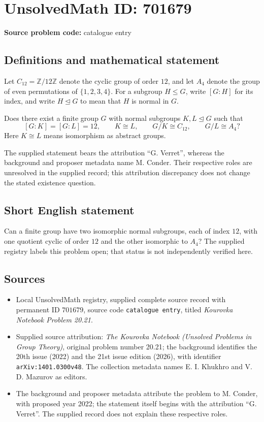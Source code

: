 \documentclass[11pt]{article}
\newcommand{\Z}{\mathbb{Z}}
\begin{document}
\section*{UnsolvedMath ID: 701679}
\textbf{Source problem code:} catalogue entry
\subsection{Definitions and mathematical statement}
Let \(C_{12}=\Z/12\Z\) denote the cyclic group of order \(12\), and let \(A_4\) denote the group of even permutations of \(\{1,2,3,4\}\). For a subgroup \(H\leq G\), write \([G:H]\) for its index, and write \(H\trianglelefteq G\) to mean that \(H\) is normal in \(G\).

Does there exist a finite group \(G\) with normal subgroups \(K,L\trianglelefteq G\) such that
\[
[G:K]=[G:L]=12,\qquad K\cong L,\qquad G/K\cong C_{12},\qquad G/L\cong A_4?
\]
Here \(K\cong L\) means isomorphism as abstract groups.

The supplied statement bears the attribution ``G. Verret'', whereas the background and proposer metadata name M. Conder. Their respective roles are unresolved in the supplied record; this attribution discrepancy does not change the stated existence question.
\subsection{Short English statement}
Can a finite group have two isomorphic normal subgroups, each of index \(12\), with one quotient cyclic of order \(12\) and the other isomorphic to \(A_4\)? The supplied registry labels this problem open; that status is not independently verified here.
\subsection{Sources}
\begin{itemize}
\item Local UnsolvedMath registry, supplied complete source record with permanent ID \(701679\), source code \texttt{catalogue entry}, titled \emph{Kourovka Notebook Problem 20.21}.
\item Supplied source attribution: \emph{The Kourovka Notebook (Unsolved Problems in Group Theory)}, original problem number 20.21; the background identifies the 20th issue (2022) and the 21st issue edition (2026), with identifier \texttt{arXiv:1401.0300v48}. The collection metadata names E. I. Khukhro and V. D. Mazurov as editors.
\item The background and proposer metadata attribute the problem to M. Conder, with proposed year 2022; the statement itself begins with the attribution ``G. Verret''. The supplied record does not explain these respective roles.
\end{itemize}
\end{document}
